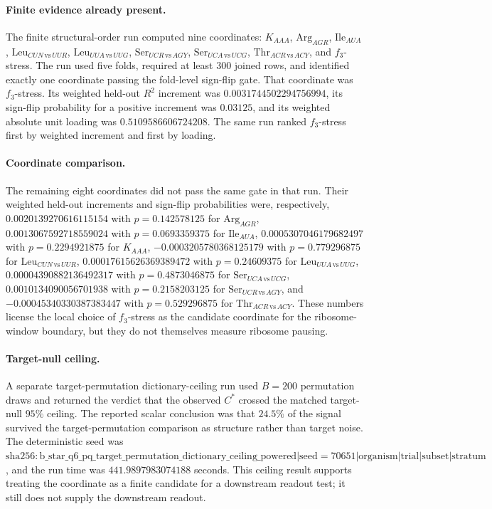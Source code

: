 \paragraph{Finite evidence already present.}
The finite structural-order run computed nine coordinates: $K_{AAA}$, $\mathrm{Arg}_{AGR}$, $\mathrm{Ile}_{AUA}$, $\mathrm{Leu}_{CUN\,\mathrm{vs}\,UUR}$, $\mathrm{Leu}_{UUA\,\mathrm{vs}\,UUG}$, $\mathrm{Ser}_{UCR\,\mathrm{vs}\,AGY}$, $\mathrm{Ser}_{UCA\,\mathrm{vs}\,UCG}$, $\mathrm{Thr}_{ACR\,\mathrm{vs}\,ACY}$, and $f_3$-stress.  The run used five folds, required at least $300$ joined rows, and identified exactly one coordinate passing the fold-level sign-flip gate.  That coordinate was $f_3$-stress.  Its weighted held-out $R^2$ increment was $0.0031744502294756994$, its sign-flip probability for a positive increment was $0.03125$, and its weighted absolute unit loading was $0.5109586606724208$.  The same run ranked $f_3$-stress first by weighted increment and first by loading.

\paragraph{Coordinate comparison.}
The remaining eight coordinates did not pass the same gate in that run.  Their weighted held-out increments and sign-flip probabilities were, respectively, $0.0020139270616115154$ with $p=0.142578125$ for $\mathrm{Arg}_{AGR}$, $0.0013067592718559024$ with $p=0.0693359375$ for $\mathrm{Ile}_{AUA}$, $0.0005307046179682497$ with $p=0.2294921875$ for $K_{AAA}$, $-0.0003205780368125179$ with $p=0.779296875$ for $\mathrm{Leu}_{CUN\,\mathrm{vs}\,UUR}$, $0.00017615626369389472$ with $p=0.24609375$ for $\mathrm{Leu}_{UUA\,\mathrm{vs}\,UUG}$, $0.00004390882136492317$ with $p=0.4873046875$ for $\mathrm{Ser}_{UCA\,\mathrm{vs}\,UCG}$, $0.0010134090056701938$ with $p=0.2158203125$ for $\mathrm{Ser}_{UCR\,\mathrm{vs}\,AGY}$, and $-0.00045340330387383447$ with $p=0.529296875$ for $\mathrm{Thr}_{ACR\,\mathrm{vs}\,ACY}$.  These numbers license the local choice of $f_3$-stress as the candidate coordinate for the ribosome-window boundary, but they do not themselves measure ribosome pausing.

\paragraph{Target-null ceiling.}
A separate target-permutation dictionary-ceiling run used $B=200$ permutation draws and returned the verdict that the observed $C^{*}$ crossed the matched target-null $95\%$ ceiling.  The reported scalar conclusion was that $24.5\%$ of the signal survived the target-permutation comparison as structure rather than target noise.  The deterministic seed was $\mathrm{sha256}:\text{b\_star\_q6\_pq\_target\_permutation\_dictionary\_ceiling\_powered}|\text{seed}=70651|\text{organism}|\text{trial}|\text{subset}|\text{stratum}$, and the run time was $441.9897983074188$ seconds.  This ceiling result supports treating the coordinate as a finite candidate for a downstream readout test; it still does not supply the downstream readout.

